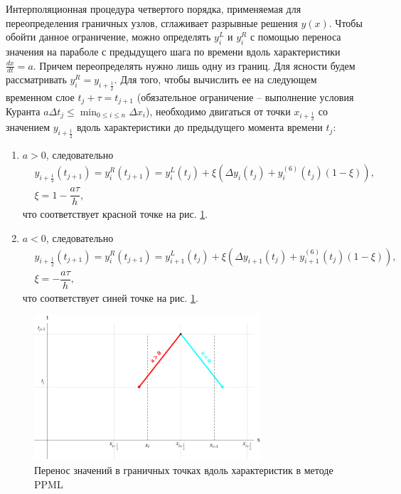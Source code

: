 \documentclass[12pt,a4paper]{article}
\newcommand{\picref}[1]{рис. \ref{#1}}
\newcommand{\half}{\frac{1}{2}}
\begin{document}
    Интерполяционная процедура четвертого порядка, применяемая для переопределения граничных узлов, сглаживает разрывные решения $y(x)$. Чтобы обойти данное ограничение, можно определять $ y_i^L $ и $ y_i^R $ с помощью переноса значения на параболе с предыдущего шага по времени вдоль характеристики $ \frac{dx}{dt} = a $. Причем переопределять нужно лишь одну из границ. Для ясности  будем рассматривать $y_i^R = y_{i+\half}$. Для того, чтобы вычислить ее на следующем временном слое $ t_j + \tau = t_{j+1}$ (обязательное ограничение -- выполнение условия Куранта $ a \Delta t_j \leq \min_{0 \leq i \leq n}\Delta x_i $), необходимо двигаться от точки $ x_{i+\half} $ со значением $ y_{i+\half} $ вдоль характеристики до предыдущего момента времени $ t_j $:
    \begin{enumerate}
        \item $ a > 0 $, следовательно
        \begin{equation}
            \label{ppml_boundary}
            \begin{split}
                &y_{i+\half}(t_{j+1}) = y_i^R(t_{j+1}) = y_i^L(t_j) + \xi(\Delta y_i(t_j) + y_i^{(6)}(t_j)(1-\xi)), \\[0.7em]
                &\xi = 1 -  \dfrac{a \tau}{h},
            \end{split}
        \end{equation}
        \noindent что соответствует красной точке на \picref{fig:ppml_visual}.

        \item $ a < 0 $, следовательно
        \[
            \begin{split}
                &y_{i+\half}(t_{j+1}) = y_i^R(t_{j+1}) = y_{i+1}^L(t_j) + \xi(\Delta y_{i+1}(t_j) + y_{i+1}^{(6)}(t_j)(1-\xi)), \\[0.7em]
                &\xi = -\dfrac{a \tau}{h},
            \end{split}  
        \]
        \noindent что соответствует синей точке на \picref{fig:ppml_visual}.
    \end{enumerate}

    \begin{figure}[h]
        \centering
        \includegraphics[width=0.75\textwidth]{ppml_visual.pdf}
        \caption{Перенос значений в граничных точках вдоль характеристик в методе PPML}
        \label{fig:ppml_visual}
    \end{figure}
\end{document}
